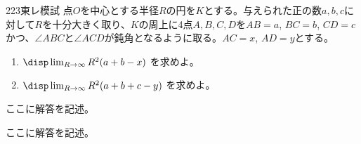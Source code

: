 \begin{prob}{223}{}{東レ模試}
 点$O$を中心とする半径$R$の円を$K$とする。与えられた正の数$a, b, c$に対して$R$を十分大きく取り、$K$の周上に4点$A, B, C, D$を$AB=a$, $BC=b$, $CD=c$かつ、$\angle{ABC}$と$\angle{ACD}$が鈍角となるように取る。$AC=x$, $AD=y$とする。
 \begin{enumerate}
  \item $\disp \lim_{R\to\infty} R^2(a+b-x)$ を求めよ。
  \item $\disp \lim_{R\to\infty} R^2(a+b+c-y)$ を求めよ。
 \end{enumerate}
\end{prob}
ここに解答を記述。

ここに解答を記述。